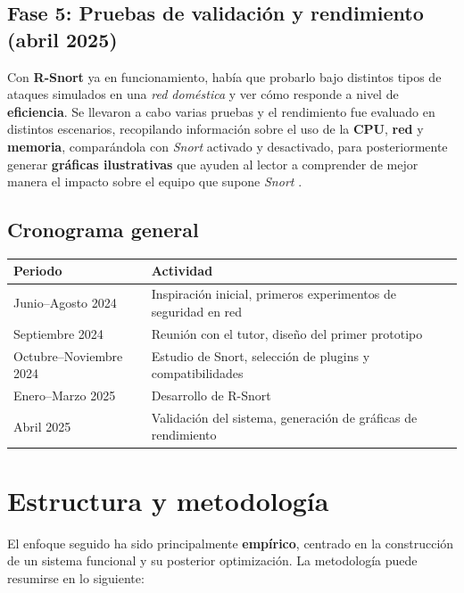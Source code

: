 \documentclass[12pt,a4paper]{report}
\begin{document}
\section{Fase 5: Pruebas de validación y rendimiento (abril 2025)}

Con \textbf{R-Snort} ya en funcionamiento, había que probarlo bajo distintos tipos de ataques simulados en una \textit{red doméstica} y ver cómo responde a nivel de \textbf{eficiencia}. Se llevaron a cabo varias pruebas y el rendimiento fue evaluado en distintos escenarios, recopilando información sobre el uso de la \textbf{CPU}, \textbf{red} y \textbf{memoria}, comparándola con \textit{Snort} activado y desactivado, para posteriormente generar \textbf{gráficas ilustrativas} que ayuden al lector a comprender de mejor manera el impacto sobre el equipo que supone \textit{Snort} \cite{kuruvila2022explainable}.

\section{Cronograma general}

\begin{center}
	\begin{tabular}{|l|l|}
		\hline
		\textbf{Periodo} & \textbf{Actividad} \\
		\hline
		Junio–Agosto 2024 & Inspiración inicial, primeros experimentos de seguridad en red \\
		Septiembre 2024 & Reunión con el tutor, diseño del primer prototipo \\
		Octubre–Noviembre 2024 & Estudio de Snort, selección de plugins y compatibilidades \\
		Enero–Marzo 2025 & Desarrollo de R-Snort \\
		Abril 2025 & Validación del sistema, generación de gráficas de rendimiento \\
		\hline
	\end{tabular}
\end{center}



\chapter{Estructura y metodología}

El enfoque seguido ha sido principalmente \textbf{empírico}, centrado en la construcción de un sistema funcional y su posterior optimización. La metodología puede resumirse en lo siguiente:
\end{document}
